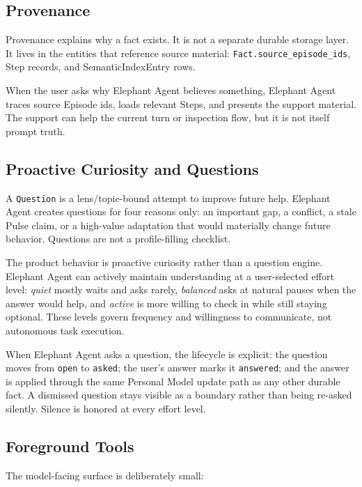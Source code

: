 \subsection{Provenance}

Provenance explains why a fact exists. It is not a separate durable storage
layer. It lives in the entities that reference source material:
\texttt{Fact.source\_episode\_ids}, Step records, and SemanticIndexEntry rows.

When the user asks why Elephant Agent believes something, Elephant Agent traces source Episode
ids, loads relevant Steps, and presents the support material. The support can
help the current turn or inspection flow, but it is not itself prompt truth.

\subsection{Proactive Curiosity and Questions}

A \texttt{Question} is a lens/topic-bound attempt to improve future help. Elephant Agent
creates questions for four reasons only: an important gap, a conflict, a stale
Pulse claim, or a high-value adaptation that would materially change future
behavior. Questions are not a profile-filling checklist.

The product behavior is proactive curiosity rather than a question engine.
Elephant Agent can actively maintain understanding at a user-selected effort level:
\textit{quiet} mostly waits and asks rarely, \textit{balanced} asks at natural
pauses when the answer would help, and \textit{active} is more willing to check
in while still staying optional. These levels govern frequency and willingness
to communicate, not autonomous task execution.

When Elephant Agent asks a question, the lifecycle is explicit: the question moves from
\texttt{open} to \texttt{asked}; the user's answer marks it \texttt{answered};
and the answer is applied through the same Personal Model update path as any
other durable fact. A dismissed question stays visible as a boundary rather
than being re-asked silently. Silence is honored at every effort level.

\subsection{Foreground Tools}

The model-facing surface is deliberately small:

